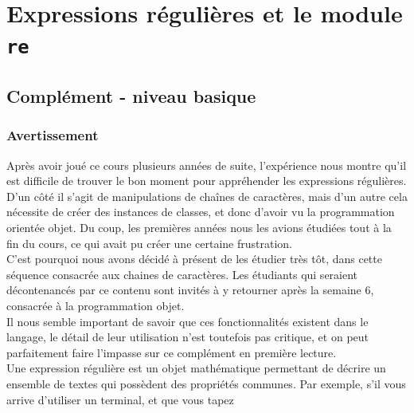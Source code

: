     \hypertarget{expressions-ruxe9guliuxe8res-et-le-module-re}{%
\section{\texorpdfstring{Expressions régulières et le module
\texttt{re}}{Expressions régulières et le module re}}\label{expressions-ruxe9guliuxe8res-et-le-module-re}}

    \hypertarget{compluxe9ment---niveau-basique}{%
\subsection{Complément - niveau
basique}\label{compluxe9ment---niveau-basique}}

    \hypertarget{avertissement}{%
\subsubsection{Avertissement}\label{avertissement}}

Après avoir joué ce cours plusieurs années de suite, l'expérience nous
montre qu'il est difficile de trouver le bon moment pour appréhender les
expressions régulières.\\

D'un côté il s'agit de manipulations de chaînes de caractères, mais d'un
autre cela nécessite de créer des instances de classes, et donc d'avoir
vu la programmation orientée objet. Du coup, les premières années nous
les avions étudiées tout à la fin du cours, ce qui avait pu créer une
certaine frustration.\\

C'est pourquoi nous avons décidé à présent de les étudier très tôt, dans
cette séquence consacrée aux chaines de caractères. Les étudiants qui
seraient décontenancés par ce contenu sont invités à y retourner après
la semaine 6, consacrée à la programmation objet.\\

Il nous semble important de savoir que ces fonctionnalités existent dans
le langage, le détail de leur utilisation n'est toutefois pas critique,
et on peut parfaitement faire l'impasse sur ce complément en première
lecture.\\

    Une expression régulière est un objet mathématique permettant de décrire
un ensemble de textes qui possèdent des propriétés communes. Par
exemple, s'il vous arrive d'utiliser un terminal, et que vous tapez

